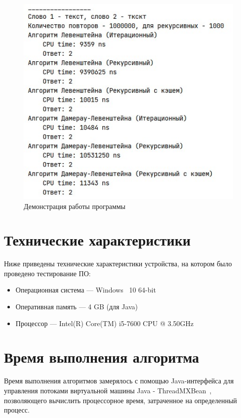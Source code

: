 \documentclass[12pt]{report}
\begin{document}
    \begin{figure}[H]
        \centering
        \includegraphics[scale=1]{img/workSample}
        \caption{Демонстрация работы программы}
        \label{fig:workSample}
    \end{figure}


    \section{Технические характеристики}
    Ниже приведены технические характеристики устройства, на котором было проведено тестирование ПО:
    \begin{itemize}
        \item Операционная система --- Windows~\cite{windows} 10 64-bit
        \item Оперативная память --- 4 GB (для Java)
        \item Процессор --- Intel(R) Core(TM) i5-7600 CPU @ 3.50GHz \cite{i5}
    \end{itemize}


    \section{Время выполнения алгоритма}
    Время выполнения алгоритмов замерялось с помощью Java-интерфейса для управления потоками
    виртуальной машины Java - ThreadMXBean~\cite{threadMXBean}, позволяющего вычислить процессорное время,
    затраченное на определенный процесс.
\end{document}
